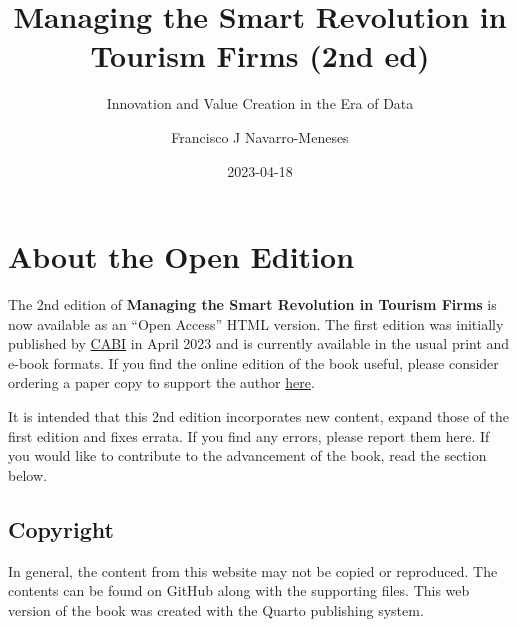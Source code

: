 \documentclass[
  letterpaper,
  DIV=11,
  numbers=noendperiod]{scrreprt}
\title{Managing the Smart Revolution in Tourism Firms (2nd ed)}
\subtitle{Innovation and Value Creation in the Era of Data}
\author{Francisco J Navarro-Meneses}
\date{2023-04-18}
\renewcommand*\contentsname{Table of contents}
\newcommand\contentsname{Table of contents}
\begin{document}
\maketitle
\ifdefined\Shaded\renewenvironment{Shaded}{\begin{tcolorbox}[boxrule=0pt, breakable, frame hidden, interior hidden, enhanced, sharp corners, borderline west={3pt}{0pt}{shadecolor}]}{\end{tcolorbox}}\fi

\renewcommand*\contentsname{Table of contents}
{
\hypersetup{linkcolor=}
\setcounter{tocdepth}{2}
\tableofcontents
}

\hypertarget{about-the-open-edition}{%
\chapter*{About the Open Edition}\label{about-the-open-edition}}


The 2nd edition of \textbf{Managing the Smart Revolution in Tourism
Firms} is now available as an ``Open Access'' HTML version. The first
edition was initially published by
\href{https://www.cabidigitallibrary.org/doi/book/10.1079/9781800620261.0000}{CABI}
in April 2023 and is currently available in the usual print and e-book
formats. If you find the online edition of the book useful, please
consider ordering a paper copy to support the author
\href{https://www.cabidigitallibrary.org/doi/book/10.1079/9781800620261.0000}{here}.

It is intended that this 2nd edition incorporates new content, expand
those of the first edition and fixes errata. If you find any errors,
please report them here. If you would like to contribute to the
advancement of the book, read the section below.

\hypertarget{copyright}{%
\section*{Copyright}\label{copyright}}


In general, the content from this website may not be copied or
reproduced. The contents can be found on GitHub along with the
supporting files. This web version of the book was created with the
Quarto publishing system.
\end{document}
